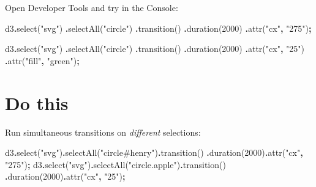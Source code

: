 \documentclass[
  openany]{book}
\newenvironment{Shaded}{\begin{snugshade}}{\end{snugshade}}
\newcommand{\DecValTok}[1]{\textcolor[rgb]{0.00,0.00,0.81}{#1}}
\newcommand{\FunctionTok}[1]{\textcolor[rgb]{0.00,0.00,0.00}{#1}}
\newcommand{\NormalTok}[1]{#1}
\newcommand{\OperatorTok}[1]{\textcolor[rgb]{0.81,0.36,0.00}{\textbf{#1}}}
\newcommand{\StringTok}[1]{\textcolor[rgb]{0.31,0.60,0.02}{#1}}
\begin{document}
Open Developer Tools and try in the Console:

\begin{Shaded}
\begin{Highlighting}[]
\NormalTok{d3}\OperatorTok{.}\FunctionTok{select}\NormalTok{(}\StringTok{"svg"}\NormalTok{)}
  \OperatorTok{.}\FunctionTok{selectAll}\NormalTok{(}\StringTok{"circle"}\NormalTok{)}
  \OperatorTok{.}\FunctionTok{transition}\NormalTok{()}
  \OperatorTok{.}\FunctionTok{duration}\NormalTok{(}\DecValTok{2000}\NormalTok{)}
  \OperatorTok{.}\FunctionTok{attr}\NormalTok{(}\StringTok{"cx"}\OperatorTok{,} \StringTok{"275"}\NormalTok{)}\OperatorTok{;}
\end{Highlighting}
\end{Shaded}

\begin{Shaded}
\begin{Highlighting}[]
\NormalTok{d3}\OperatorTok{.}\FunctionTok{select}\NormalTok{(}\StringTok{"svg"}\NormalTok{)}
  \OperatorTok{.}\FunctionTok{selectAll}\NormalTok{(}\StringTok{"circle"}\NormalTok{)}
  \OperatorTok{.}\FunctionTok{transition}\NormalTok{()}
  \OperatorTok{.}\FunctionTok{duration}\NormalTok{(}\DecValTok{2000}\NormalTok{)}
  \OperatorTok{.}\FunctionTok{attr}\NormalTok{(}\StringTok{"cx"}\OperatorTok{,} \StringTok{"25"}\NormalTok{)}
  \OperatorTok{.}\FunctionTok{attr}\NormalTok{(}\StringTok{"fill"}\OperatorTok{,} \StringTok{"green"}\NormalTok{)}\OperatorTok{;}
\end{Highlighting}
\end{Shaded}

\hypertarget{do-this}{%
\section{Do this}\label{do-this}}

Run simultaneous transitions on \emph{different} selections:

\begin{Shaded}
\begin{Highlighting}[]
\NormalTok{d3}\OperatorTok{.}\FunctionTok{select}\NormalTok{(}\StringTok{"svg"}\NormalTok{)}\OperatorTok{.}\FunctionTok{selectAll}\NormalTok{(}\StringTok{"circle\#henry"}\NormalTok{)}\OperatorTok{.}\FunctionTok{transition}\NormalTok{()}
    \OperatorTok{.}\FunctionTok{duration}\NormalTok{(}\DecValTok{2000}\NormalTok{)}\OperatorTok{.}\FunctionTok{attr}\NormalTok{(}\StringTok{"cx"}\OperatorTok{,} \StringTok{"275"}\NormalTok{)}\OperatorTok{;}
\NormalTok{d3}\OperatorTok{.}\FunctionTok{select}\NormalTok{(}\StringTok{"svg"}\NormalTok{)}\OperatorTok{.}\FunctionTok{selectAll}\NormalTok{(}\StringTok{"circle.apple"}\NormalTok{)}\OperatorTok{.}\FunctionTok{transition}\NormalTok{()}
    \OperatorTok{.}\FunctionTok{duration}\NormalTok{(}\DecValTok{2000}\NormalTok{)}\OperatorTok{.}\FunctionTok{attr}\NormalTok{(}\StringTok{"cx"}\OperatorTok{,} \StringTok{"25"}\NormalTok{)}\OperatorTok{;}
\end{Highlighting}
\end{Shaded}
\end{document}
